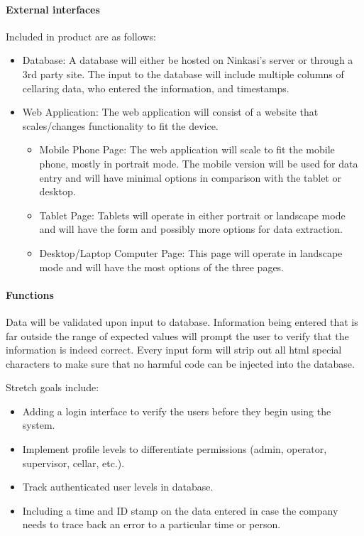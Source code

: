 	\paragraph{External interfaces}
    Included in product are as follows:
        \begin{itemize}
				\item{Database: A database will either be hosted on Ninkasi's server or through a 3rd party site.
                The input to the database will include multiple columns of cellaring data, who entered the information, and timestamps. }

            \item{Web Application:}
            The web application will consist of a website that scales/changes functionality to fit the device.

                \begin{itemize}
				    \item{Mobile Phone Page: The web application will scale to fit the mobile phone, mostly in portrait mode.
					The mobile version will be used for data entry and will have minimal options in comparison with the tablet or desktop.}

                    \item{Tablet Page: Tablets will operate in either portrait or landscape mode and will have the form and possibly more options for data extraction.}

                    \item{Desktop/Laptop Computer Page: This page will operate in landscape mode and will have the most options of the three pages.}

                \end{itemize}
        \end{itemize}

	\paragraph{Functions}

		Data will be validated upon input to database.
		Information being entered that is far outside the range of expected values will prompt the user to verify that the information is indeed correct.
		Every input form will strip out all html special characters to make sure that no harmful code can be injected into the database.

		Stretch goals include:
		\begin{itemize}
			\item{Adding a login interface to verify the users before they begin using the system.}

            \item{Implement profile levels to differentiate permissions (admin, operator, supervisor, cellar, etc.).}

            \item{Track authenticated user levels in database.}

			\item{Including a time and ID stamp on the data entered in case the company needs to trace back an error to a particular time or person.}
		\end{itemize}

